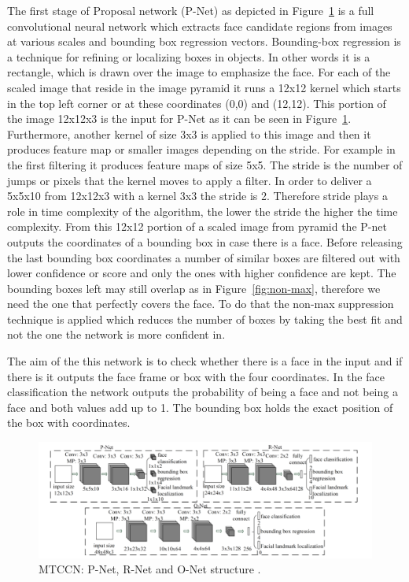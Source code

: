 The first stage of Proposal network (P-Net) as depicted in Figure~\ref{fig:3stages} is a full convolutional neural network which extracts face candidate regions from images at various scales and bounding box regression vectors. Bounding-box regression is a technique for refining or localizing boxes in objects. In other words it is a rectangle, which is drawn over the image to emphasize the face. For each of the scaled image that reside in the image pyramid it runs a 12x12 kernel which starts in the top left corner or at these coordinates (0,0) and (12,12). This portion of the image 12x12x3 is the input for P-Net as it can be seen in Figure~\ref{fig:3stages}. Furthermore, another kernel of size 3x3 is applied to this image  and then it produces feature map or smaller images depending on the stride. For example in the first filtering it produces feature maps of size 5x5. The stride is the number of jumps or pixels that the kernel moves to apply a filter. In order to deliver a 5x5x10 from 12x12x3 with a kernel 3x3 the stride is 2. Therefore stride plays a role in time complexity of the algorithm, the lower the stride the higher the time complexity. From this 12x12 portion of a scaled image from pyramid the P-net outputs the coordinates of a bounding box in case there is a face. Before releasing the last bounding box coordinates a number of similar boxes are filtered out with lower confidence or score and only the ones with higher confidence are kept. The bounding boxes left may still overlap as in Figure~\ref{fig:non-max}, therefore we need the one that perfectly covers the face. To do that the non-max suppression technique is applied which reduces the number of boxes by taking the best fit and not the one the network is more confident in. 




The aim of the this network is to check whether there is a face in the input and if there is it outputs the face frame or box with the four coordinates. In the face classification the network outputs the probability of being a face and not being a face and both values add up to 1. The bounding box holds the exact position of the box with coordinates. 


\begin{figure}[!htb]
    \centering
    \includegraphics[width=1\textwidth]{figures/3stages.png}
    \caption{ MTCCN: P-Net, R-Net and O-Net structure \cite{refmtcnn}.}
    \label{fig:3stages}
\end{figure}


